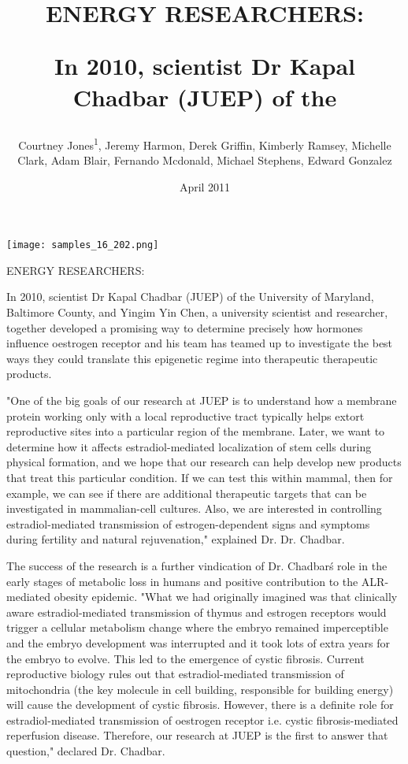 \documentclass{article}
\title{ENERGY RESEARCHERS:

In 2010, scientist Dr Kapal Chadbar (JUEP) of the}
\author{Courtney Jones\textsuperscript{1},  Jeremy Harmon,  Derek Griffin,  Kimberly Ramsey,  Michelle Clark,  Adam Blair,  Fernando Mcdonald,  Michael Stephens,  Edward Gonzalez}
\affil{\textsuperscript{1}Changsha University of Science and Technology}
\date{April 2011}
\begin{document}
\maketitle

\begin{center}
\begin{minipage}{0.75\linewidth}
\texttt{[image: samples\_16\_202.png]}
\end{minipage}
\end{center}

ENERGY RESEARCHERS:

In 2010, scientist Dr Kapal Chadbar (JUEP) of the University of Maryland, Baltimore County, and Yingim Yin Chen, a university scientist and researcher, together developed a promising way to determine precisely how hormones influence oestrogen receptor and his team has teamed up to investigate the best ways they could translate this epigenetic regime into therapeutic therapeutic products.

"One of the big goals of our research at JUEP is to understand how a membrane protein working only with a local reproductive tract typically helps extort reproductive sites into a particular region of the membrane. Later, we want to determine how it affects estradiol-mediated localization of stem cells during physical formation, and we hope that our research can help develop new products that treat this particular condition. If we can test this within mammal, then for example, we can see if there are additional therapeutic targets that can be investigated in mammalian-cell cultures. Also, we are interested in controlling estradiol-mediated transmission of estrogen-dependent signs and symptoms during fertility and natural rejuvenation," explained Dr. Dr. Chadbar.

The success of the research is a further vindication of Dr. Chadbar\'s role in the early stages of metabolic loss in humans and positive contribution to the ALR-mediated obesity epidemic. "What we had originally imagined was that clinically aware estradiol-mediated transmission of thymus and estrogen receptors would trigger a cellular metabolism change where the embryo remained imperceptible and the embryo development was interrupted and it took lots of extra years for the embryo to evolve. This led to the emergence of cystic fibrosis. Current reproductive biology rules out that estradiol-mediated transmission of mitochondria (the key molecule in cell building, responsible for building energy) will cause the development of cystic fibrosis. However, there is a definite role for estradiol-mediated transmission of oestrogen receptor i.e. cystic fibrosis-mediated reperfusion disease. Therefore, our research at JUEP is the first to answer that question," declared Dr. Chadbar.
\end{document}
